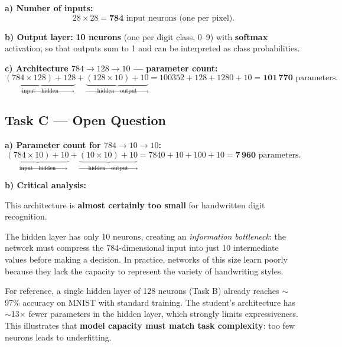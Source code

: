 \documentclass[11pt, a4paper]{article}
\begin{document}
\textbf{a) Number of inputs:}
\[
  28 \times 28 = \mathbf{784} \text{ input neurons (one per pixel).}
\]

\textbf{b) Output layer:} \textbf{10 neurons} (one per digit class, 0--9) with
\textbf{softmax} activation, so that outputs sum to 1 and can be interpreted as class
probabilities.

\textbf{c) Architecture $784 \to 128 \to 10$ — parameter count:}
\[
  \underbrace{(784 \times 128) + 128}_{\text{input} \to \text{hidden}} +
  \underbrace{(128 \times 10) + 10}_{\text{hidden} \to \text{output}}
  = 100352 + 128 + 1280 + 10 = \mathbf{101\,770} \text{ parameters.}
\]

\subsection*{Task C — Open Question}

\textbf{a) Parameter count for $784 \to 10 \to 10$:}
\[
  \underbrace{(784 \times 10) + 10}_{\text{input} \to \text{hidden}} +
  \underbrace{(10 \times 10) + 10}_{\text{hidden} \to \text{output}}
  = 7840 + 10 + 100 + 10 = \mathbf{7\,960} \text{ parameters.}
\]

\textbf{b) Critical analysis:}

\begin{tcolorbox}[solutionbox]
This architecture is \textbf{almost certainly too small} for handwritten digit recognition.

The hidden layer has only 10 neurons, creating an \emph{information bottleneck}: the network
must compress the 784-dimensional input into just 10 intermediate values before making a
decision. In practice, networks of this size learn poorly because they lack the capacity to
represent the variety of handwriting styles.

For reference, a single hidden layer of 128 neurons (Task B) already reaches $\sim$97\%
accuracy on MNIST with standard training. The student's architecture has $\sim$13$\times$
fewer parameters in the hidden layer, which strongly limits expressiveness. This illustrates
that \textbf{model capacity must match task complexity}: too few neurons leads to
underfitting.
\end{tcolorbox}
\end{document}
